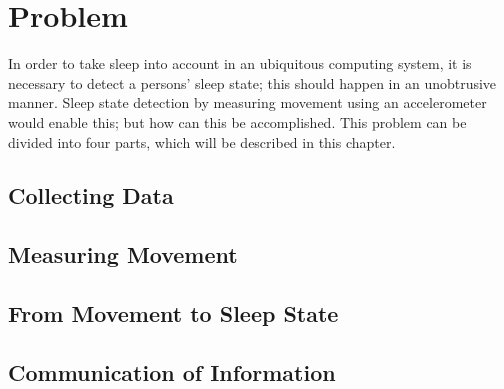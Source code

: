 \chapter{Problem} %
\label{cha:problem}
In order to take sleep into account in an ubiquitous computing system, it is necessary to detect a persons' sleep state; this should happen in an unobtrusive manner. Sleep state detection by measuring movement using an accelerometer would enable this; but how can this be accomplished. This problem can be divided into four parts, which will be described in this chapter.

\section{Collecting Data} %
\label{sec:collecting_data}


\section{Measuring Movement} %
\label{sec:measuring_movement}


\section{From Movement to Sleep State} %
\label{sec:translate_movement_patterns_to_sleep_states}


\section{Communication of Information} %
\label{sec:communicating_relevant_information}


